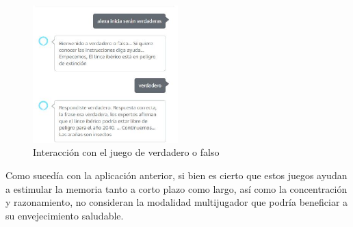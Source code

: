 \begin{figure}[H]
	\centering
	\includegraphics[width=0.5\textwidth]{imgs/tfg-juegos-2.JPG}
	\caption{Interacción con el juego de verdadero o falso}
	\label{fig:tfg-juegos-2}
\end{figure}

Como sucedía con la aplicación anterior, si bien es cierto que estos juegos ayudan a estimular la memoria tanto a corto plazo como largo, así como la concentración y razonamiento, no consideran la modalidad multijugador que podría beneficiar a su envejecimiento saludable.
